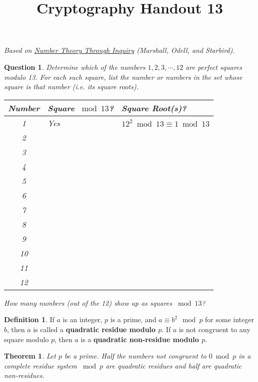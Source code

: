 \documentclass[12pt]{amsart}
\makeatletter
\def\subtitle#1{\gdef\@subtitle{#1}}
\def\@subtitle{}
\theoremstyle{plain}
\newtheorem{thm}{Theorem}
\newtheorem{quest}{Question}
\theoremstyle{definition}
\newtheorem*{defn}{Definition}
\theoremstyle{remark}
\makeatother
\begin{document}
\onehalfspacing

\title[]{Cryptography Handout 13}
\subtitle{Square Roots and Squares}
\maketitle

\begin{center}
\emph{Based on \underline{Number Theory Through Inquiry} (Marshall, Odell, and Starbird)}.
\end{center}

\begin{quest} 
Determine which of the numbers $1, 2, 3, \cdots, 12$ are perfect squares modulo 13.  For each such square, list the number or numbers in the set whose square is that number (i.e. its square roots).\\
\begin{center}
\begin{tabular}{|c|p{1.5in}|p{2.5in}|} \hline
Number & Square $\bmod 13$? & Square Root(s)?\\ \hline
1&Yes&$12^2 \bmod 13 \equiv 1 \bmod 13$\\ [.2in]
2&&\\ [.2in]
3&&\\ [.2in]
4&&\\ [.2in]
5&&\\ [.2in]
6&&\\ [.2in]
7&&\\ [.2in]
8&&\\ [.2in]
9&&\\ [.2in]
10&&\\ [.2in]
11&&\\ [.2in]
12&&\\  [.2in]\hline
\end{tabular}
\end{center}

How many numbers (out of the 12) show up as squares $\bmod 13$?
\end{quest}

\newpage
\begin{defn} If $a$ is an integer, $p$ is a prime, and $a \equiv b^2 \mod p$ for some integer $b$, then $a$ is called a \textbf{quadratic residue modulo $p$}.  If $a$ is not congruent to any square modulo $p$, then $a$ is a \textbf{quadratic non-residue modulo $p$}.
\end{defn}

\begin{thm}
Let $p$ be a prime.  Half the numbers not congruent to $0 \bmod p$ in a complete residue system $\bmod p$ are quadratic residues and half are quadratic non-residues.
\end{thm}
\end{document}
